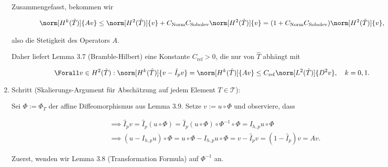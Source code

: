 \begin{solution}
\begin{enumerate}[label = \textbf{\alph*)}]
\begin{enumerate}[label = \arabic*.]
      Zusammengefasst, bekommen wir
  
      \begin{align*}
        \norm[H^k(\hat T)]{A v}
        \leq
        \norm[H^2(\hat T)]{v}
        +
        C_\mathrm{Norm}
        C_\mathrm{Sobolev}
        \norm[H^2(\hat T)]{v}
        =
        (1 + C_\mathrm{Norm} C_\mathrm{Sobolev})
        \norm[H^2(\hat T)]{v},
      \end{align*}
  
      also die Stetigkeit des Operators $A$.
  
  
      Daher liefert Lemma 3.7 (Bramble-Hilbert) eine Konstante $C_\mathrm{ref} > 0$, die nur von $\hat T$ abhängt mit
  
      \begin{align*}
        \Forall v \in H^2(\hat T):
        \norm[H^k(\hat T)]{v - \hat I_p v}
        =
        \norm[H^k(\hat T)]{A v}
        \leq
        C_\mathrm{ref}
        \norm[L^2(\hat T)]{D^2 v},
        \quad
        k = 0, 1.
      \end{align*}
  
      \item Schritt (Skalierungs-Argument für Abschätzung auf jedem Element $T \in \mathcal{T}$):
  
      Sei $\Phi := \Phi_T$ der affine Diffeomorphismus aus Lemma 3.9.
      Setze $v := u \circ \Phi$ und observiere, dass
  
      \begin{align*}
        & \implies
        \hat I_p v
        =
        \hat I_p (u \circ \Phi)
        =
        \hat I_p (u \circ \Phi) \circ \Phi^{-1} \circ \Phi
        =
        I_{h, p} u \circ \Phi \\
        & \implies
        (u - I_{h, p} u) \circ \Phi
        =
        u \circ \Phi - I_{h, p} u \circ \Phi
        =
        v - \hat I_p v
        =
        (1 - \hat I_p) v
        =
        A v.
      \end{align*}
  
      Zuerst, wenden wir Lemma 3.8 (Transformation Formula) auf $\Phi^{-1}$ an.
  
  

\end{enumerate}
\end{enumerate}
\end{solution}
